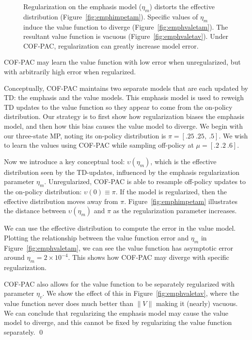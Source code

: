 \begin{figure}
  
  \label{fig:emphasisplotseta}
  \caption{Regularization on the emphasis model ($\eta_m$) distorts the effective distribution (Figure~\ref{fig:emphimpetam}). Specific values of $\eta_m$ induce the value function to diverge (Figure~\ref{fig:emphvaletam}). The resultant value function is vacuous (Figure~\ref{fig:emphvaletav}). Under COF-PAC, regularization can greatly increase model error. }
\end{figure}


\begin{example}\label{ex:emph}
  COF-PAC may learn the value function with low error when unregularized, but with arbitrarily high error when regularized.

  \proof Conceptually, COF-PAC maintains two separate models that are each updated by TD: the emphasis and the value models. This emphasis model is used to reweigh TD updates to the value function so they appear to come from the on-policy distribution. Our strategy is to first show how regularization biases the emphasis model, and then how this bias causes the value model to diverge.
  We begin with our three-state MP, noting its on-policy distribution is $\pi=[.25~.25,~.5]$. We wish to learn the values using COF-PAC while sampling off-policy at $\mu=[.2~.2~.6]$.

  Now we introduce a key conceptual tool: $\upsilon(\eta_m)$, which is the effective distribution seen by the TD-updates, influenced by the emphasis regularization parameter $\eta_m$. Unregularized, COF-PAC is able to resample off-policy updates to the on-policy distribution:  $\upsilon(0) \equiv \pi$. If the model is regularized, then the effective distribution moves away from $\pi$. Figure~\ref{fig:emphimpetam} illustrates the distance between $\upsilon(\eta_m)$ and $\pi$ as the regularization parameter increases.

  We can use the effective distribution to compute the error in the value model. Plotting the relationship between the value function error and $\eta_m$ in Figure~\ref{fig:emphvaletam}, we can see the value function has asymptotic error around $\eta_m=2\times 10^{-4}$. This shows how COF-PAC may diverge with specific regularization.

  COF-PAC also allows for the value function to be separately regularized with parameter $\eta_v$. We show the effect of this in Figure~\ref{fig:emphvaletav}, where the value function never does much better than $\|V\|$ making it (nearly) vacuous. We can conclude that regularizing the emphasis model may cause the value model to diverge, and this cannot be fixed by regularizing the value function separately. \qed
\end{example}

